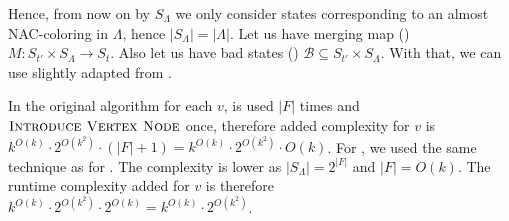 Hence, from now on by \( S_\Lambda \) we only consider states corresponding to
an almost NAC-coloring in \( \Lambda \), hence \( |S_\Lambda| = |\Lambda| \).
%
Let us have%
merging map ()
\( M : S_{t'} \times S_\Lambda \to S_t \).
Also let us have bad states ()
\( \mathcal{B} \subseteq S_{t'} \times S_\Lambda \).
%
With that, we can use slightly adapted 
from \JoinNode{}.


In the original algorithm for each \( v \),
\IntroduceEdgeNode{} is used \( |F| \) times
and \( \textsc{Introduce Vertex Node}{} \) once, therefore added complexity for \( v \)
is \( {k}^{O(k)} \cdot 2^{O(k^2)} \cdot (|F| + 1) = {k}^{O(k)} \cdot 2^{O(k^2)} \cdot O(k) \).
%
For \IntroduceVertexWithEdgesNode{},
we used the same technique as for \JoinNode{}.
The complexity is lower as \( |S_\Lambda| = 2^{|F|} \) and \( |F| = O(k) \).
The runtime complexity added for \( v \) is therefore
\( {k}^{O(k)} \cdot 2^{O(k^2)} \cdot 2^{O(k)} = {k}^{O(k)} \cdot 2^{O(k^2)}\).

